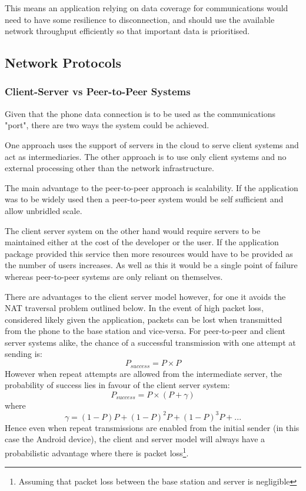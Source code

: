 This means an application relying on data coverage for communications would need to have some resilience to disconnection, and should use the available network throughput efficiently so that important data is prioritised.

\subsection{Network Protocols}

\subsubsection{Client-Server vs Peer-to-Peer Systems}
Given that the phone data connection is to be used as the communications "port", there are two ways the system could be achieved.

One approach uses the support of servers in the cloud to serve client systems and act as intermediaries. The other approach is to use only client systems and no external processing other than the network infrastructure.

The main advantage to the peer-to-peer approach is scalability. If the application was to be widely used then a peer-to-peer system would be self sufficient and allow unbridled scale.

The client server system on the other hand would require servers to be maintained either at the cost of the developer or the user. If the application package provided this service then more resources would have to be provided as the number of users increases. As well as this it would be a single point of failure whereas peer-to-peer systems are only reliant on themselves.

There are advantages to the client server model however, for one it avoids the NAT traversal problem outlined below. In the event of high packet loss, considered likely given the application, packets can be lost when transmitted from the phone to the base station and vice-versa. For peer-to-peer and client server systems alike, the chance of a successful transmission with one attempt at sending is:
\begin{equation}
P_{success} = P \times P
\end{equation}
However when repeat attempts are allowed from the intermediate server, the probability of success lies in favour of the client server system:
\begin{equation}
P_{success} = P \times (P + \gamma)
\end{equation}
where
\begin{equation}
\gamma = (1-P)P + (1-P)^2P + (1-P)^3P + ...
\end{equation}
Hence even when repeat transmissions are enabled from the initial sender (in this case the Android device), the client and server model will always have a probabilistic advantage where there is packet loss\footnote{Assuming that packet loss between the base station and server is negligible}.

